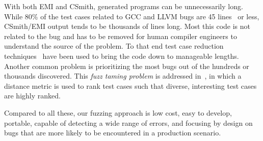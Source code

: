 With both EMI and CSmith, generated programs can be unnecessarily long. While 80\% of the test cases related to GCC and LLVM bugs are 45 lines~\cite{Sun2016} or less, CSmith/EMI output tends to be thousands of lines long. Most this code is not related to the bug and has to be removed for human compiler engineers to understand the source of the problem. To that end test case reduction techniques~\cite{Regehr2012a,Pflanzer2016} have been used to bring the code down to manageable lengths. Another common problem is prioritizing the most bugs out of the hundreds or thousands discovered. This \emph{fuzz taming problem} is addressed in~\cite{Chen2013}, in which a distance metric is used to rank test cases such that diverse, interesting test cases are highly ranked.

Compared to all these, our fuzzing approach is low cost, easy to develop, portable, capable of detecting a wide range of errors, and focusing by design on bugs that are more likely to be encountered in a production scenario.





